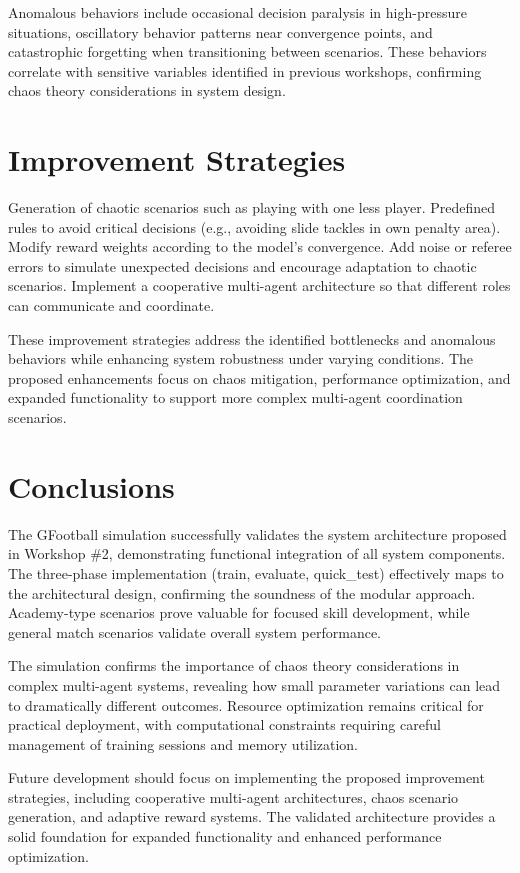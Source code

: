 \documentclass[12pt,a4paper]{article}
\begin{document}
Anomalous behaviors include occasional decision paralysis in high-pressure situations, oscillatory behavior patterns near convergence points, and catastrophic forgetting when transitioning between scenarios. These behaviors correlate with sensitive variables identified in previous workshops, confirming chaos theory considerations in system design.

\section{Improvement Strategies}

Generation of chaotic scenarios such as playing with one less player. Predefined rules to avoid critical decisions (e.g., avoiding slide tackles in own penalty area). Modify reward weights according to the model's convergence. Add noise or referee errors to simulate unexpected decisions and encourage adaptation to chaotic scenarios. Implement a cooperative multi-agent architecture so that different roles can communicate and coordinate.

These improvement strategies address the identified bottlenecks and anomalous behaviors while enhancing system robustness under varying conditions. The proposed enhancements focus on chaos mitigation, performance optimization, and expanded functionality to support more complex multi-agent coordination scenarios.

\section{Conclusions}

The GFootball simulation successfully validates the system architecture proposed in Workshop \#2, demonstrating functional integration of all system components. The three-phase implementation (train, evaluate, quick\_test) effectively maps to the architectural design, confirming the soundness of the modular approach. Academy-type scenarios prove valuable for focused skill development, while general match scenarios validate overall system performance.

The simulation confirms the importance of chaos theory considerations in complex multi-agent systems, revealing how small parameter variations can lead to dramatically different outcomes. Resource optimization remains critical for practical deployment, with computational constraints requiring careful management of training sessions and memory utilization.

Future development should focus on implementing the proposed improvement strategies, including cooperative multi-agent architectures, chaos scenario generation, and adaptive reward systems. The validated architecture provides a solid foundation for expanded functionality and enhanced performance optimization.
\end{document}
